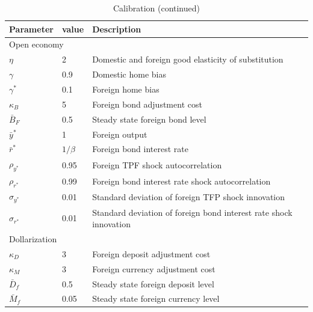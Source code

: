 \documentclass[12pt]{article}
\begin{document}
\begin{table}[h!]
\begin{tabular}{lll}
\hline\hline
Parameter        & value       & Description                                  \\ \hline
\multicolumn{3}{l}{Open economy}                                                            \\
$\eta$           & 2          & Domestic and foreign good elasticity of substitution              \\
$\gamma$         & 0.9        & Domestic home bias                                                \\
$\gamma^*$    & 0.1        & Foreign home bias                                                 \\
$\kappa_B$       & 5          & Foreign bond adjustment cost                                      \\
$\bar{B}_F$        & 0.5        & Steady state foreign bond level                                               \\
$\bar{y}^*$    & 1          & Foreign output                                                    \\
$\bar{r}^*$    & $1/\beta$     & Foreign bond interest rate                                        \\
$\rho_{y^*}$    & 0.95       & Foreign TPF shock autocorrelation                                 \\
$\rho_{r^*}$    & 0.99       & Foreign bond interest rate shock autocorrelation                  \\
$\sigma_{y^*}$ & 0.01       & Standard deviation of foreign TFP shock innovation                \\
$\sigma_{r^*}$& 0.01       & Standard deviation of foreign bond interest rate shock innovation \\\hline
\multicolumn{3}{l}{Dollarization}                                                            \\
$\kappa_D$       & 3          & Foreign deposit adjustment cost                                   \\
$\kappa_M$       & 3          & Foreign currency adjustment cost                                  \\
$\bar{D}_f$        & 0.5        & Steady state foreign deposit level                                                \\
$\bar{M}_f$       & 0.05       & Steady state foreign currency level                                                \\\hline
\end{tabular}
\caption{Calibration (continued)}
\end{table}
\end{document}
